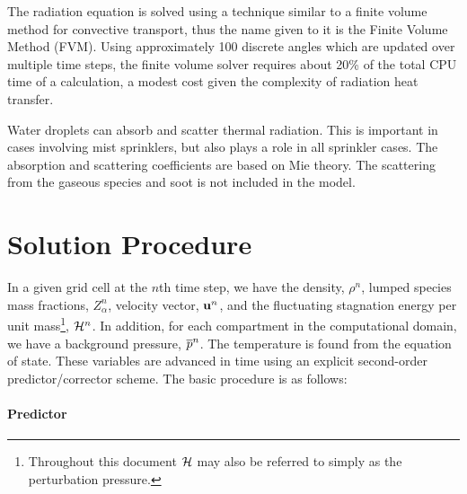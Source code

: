 The radiation equation is solved using a technique similar to a finite
volume method for convective transport, thus the name given to it is
the Finite Volume Method (FVM). Using approximately 100 discrete
angles which are updated over multiple time steps, the finite volume solver requires about 20\% of the total CPU
time of a calculation, a modest cost given the complexity of radiation
heat transfer.

Water droplets can absorb and scatter thermal
radiation. This is important in cases involving mist sprinklers, but
also plays a role in all sprinkler cases. The absorption and
scattering coefficients are based on Mie theory. The scattering from
the gaseous species and soot is not included in the model.



\section{Solution Procedure}
\label{sec:solution_procedure}

In a given grid cell at the $n$th time step, we have the density, $\rho^n$, lumped species mass fractions, $Z_\alpha^n$, velocity
vector, ${\mathbf{u}}^n$, and the fluctuating stagnation energy per unit mass\footnote{Throughout this document $\mathcal{H}$ may also be referred to simply as the perturbation pressure.}, $\mathcal{H}^n$.
In addition, for each compartment in the computational domain, we have a background pressure, $\overline{p}^n$. The temperature is
found from the equation of state. These variables are advanced in time using an explicit second-order predictor/corrector scheme.
The basic procedure is as follows:

\paragraph{Predictor}


